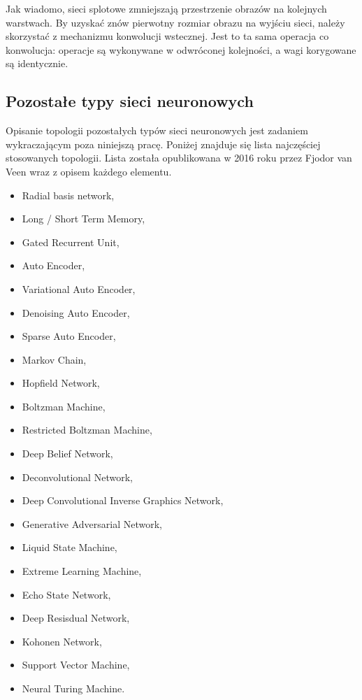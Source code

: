 \documentclass[12pt,a4paper,twoside,titlepage,openright]{book}
\begin{document}
\begin{itemize}
\begin{itemize}
Jak wiadomo, sieci splotowe zmniejszają przestrzenie obrazów na kolejnych warstwach. By uzyskać znów pierwotny rozmiar obrazu na wyjściu sieci, należy skorzystać z mechanizmu konwolucji wstecznej. Jest to ta sama operacja co konwolucja: operacje są wykonywane w odwróconej kolejności, a wagi korygowane są identycznie.\cite{DBLP:journals/corr/LongSD14}

\subsection{Pozostałe typy sieci neuronowych}
Opisanie topologii pozostałych typów sieci neuronowych jest zadaniem wykraczającym poza niniejszą pracę. Poniżej znajduje się lista najczęściej stosowanych topologii. Lista została opublikowana w 2016 roku przez Fjodor van Veen wraz z opisem każdego elementu.\cite{siteFjodorList}

\begin{itemize}
\item Radial basis network,
\item Long / Short Term Memory,
\item Gated Recurrent Unit,
\item Auto Encoder,
\item Variational Auto Encoder,
\item Denoising Auto Encoder,
\item Sparse Auto Encoder,
\item Markov Chain,
\item Hopfield Network,
\item Boltzman Machine,
\item Restricted Boltzman Machine,
\item Deep Belief Network,
\item Deconvolutional Network,
\item Deep Convolutional Inverse Graphics Network,
\item Generative Adversarial Network,
\item Liquid State Machine,
\item Extreme Learning Machine,
\item Echo State Network,
\item Deep Resisdual Network,
\item Kohonen Network,
\item Support Vector Machine,
\item Neural Turing Machine.
\end{itemize}


\end{itemize}
\end{itemize}
\end{document}
